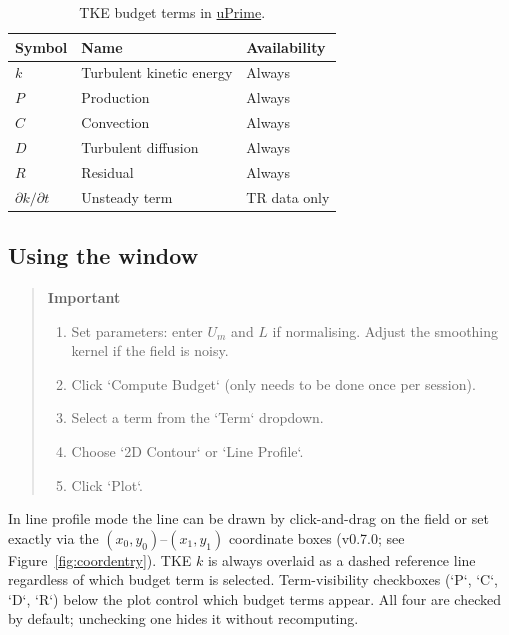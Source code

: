 \begin{table}[htbp]
\centering
\caption{TKE budget terms in \href{https://cmdrryder.github.io/uPrime/}{uPrime}.}
\begin{tabular}{lll}
\toprule
\textbf{Symbol} & \textbf{Name} & \textbf{Availability} \\
\midrule
$k$                     & Turbulent kinetic energy  & Always \\
$P$                     & Production                & Always \\
$C$                     & Convection                & Always \\
$D$                     & Turbulent diffusion       & Always \\
$R$                     & Residual                  & Always \\
$\partial k/\partial t$ & Unsteady term             & TR data only \\
\bottomrule
\end{tabular}
\end{table}

\subsection{Using the window}

\begin{quote}
\textbf{Important}
\begin{enumerate}[leftmargin=1.5em, topsep=2pt]
  \item Set parameters: enter $U_m$ and $L$ if normalising. Adjust the smoothing kernel if the field is noisy.
  \item Click `Compute Budget` (only needs to be done once per session).
  \item Select a term from the `Term` dropdown.
  \item Choose `2D Contour` or `Line Profile`.
  \item Click `Plot`.
\end{enumerate}
\end{quote}

In line profile mode the line can be drawn by click-and-drag on the field or set exactly via the $(x_0, y_0)$--$(x_1, y_1)$ coordinate boxes (v0.7.0; see Figure~\ref{fig:coordentry}). TKE $k$ is always overlaid as a dashed reference line regardless of which budget term is selected. Term-visibility checkboxes (`P`, `C`, `D`, `R`) below the plot control which budget terms appear. All four are checked by default; unchecking one hides it without recomputing.

